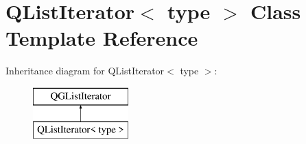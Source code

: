 \hypertarget{class_q_list_iterator}{}\section{Q\+List\+Iterator$<$ type $>$ Class Template Reference}
\label{class_q_list_iterator}
Inheritance diagram for Q\+List\+Iterator$<$ type $>$\+:\begin{figure}[H]
\begin{center}
\leavevmode
\includegraphics[height=2.000000cm]{class_q_list_iterator}
\end{center}
\end{figure}
